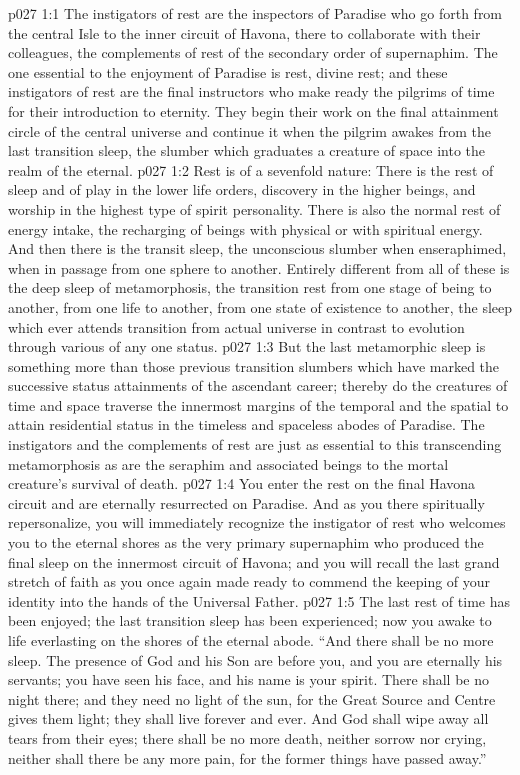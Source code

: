 \vs p027 1:1 The instigators of rest are the inspectors of Paradise who go forth from the central Isle to the inner circuit of Havona, there to collaborate with their colleagues, the complements of rest of the secondary order of supernaphim. The one essential to the enjoyment of Paradise is rest, divine rest; and these instigators of rest are the final instructors who make ready the pilgrims of time for their introduction to eternity. They begin their work on the final attainment circle of the central universe and continue it when the pilgrim awakes from the last transition sleep, the slumber which graduates a creature of space into the realm of the eternal.
\vs p027 1:2 \pc Rest is of a sevenfold nature: There is the rest of sleep and of play in the lower life orders, discovery in the higher beings, and worship in the highest type of spirit personality. There is also the normal rest of energy intake, the recharging of beings with physical or with spiritual energy. And then there is the transit sleep, the unconscious slumber when enseraphimed, when in passage from one sphere to another. Entirely different from all of these is the deep sleep of metamorphosis, the transition rest from one stage of being to another, from one life to another, from one state of existence to another, the sleep which ever attends transition from actual universe  in contrast to evolution through various  of any one status.
\vs p027 1:3 But the last metamorphic sleep is something more than those previous transition slumbers which have marked the successive status attainments of the ascendant career; thereby do the creatures of time and space traverse the innermost margins of the temporal and the spatial to attain residential status in the timeless and spaceless abodes of Paradise. The instigators and the complements of rest are just as essential to this transcending metamorphosis as are the seraphim and associated beings to the mortal creature’s survival of death.
\vs p027 1:4 \pc You enter the rest on the final Havona circuit and are eternally resurrected on Paradise. And as you there spiritually repersonalize, you will immediately recognize the instigator of rest who welcomes you to the eternal shores as the very primary supernaphim who produced the final sleep on the innermost circuit of Havona; and you will recall the last grand stretch of faith as you once again made ready to commend the keeping of your identity into the hands of the Universal Father.
\vs p027 1:5 The last rest of time has been enjoyed; the last transition sleep has been experienced; now you awake to life everlasting on the shores of the eternal abode. “And there shall be no more sleep. The presence of God and his Son are before you, and you are eternally his servants; you have seen his face, and his name is your spirit. There shall be no night there; and they need no light of the sun, for the Great Source and Centre gives them light; they shall live forever and ever. And God shall wipe away all tears from their eyes; there shall be no more death, neither sorrow nor crying, neither shall there be any more pain, for the former things have passed away.”
